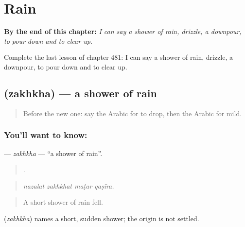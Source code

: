 
\chapter{Rain}
\label{ch:ar-rain}

\begin{chapteropening}
\textbf{By the end of this chapter:} \emph{I can say a shower of rain, drizzle, a downpour, to pour down and to clear up.}

Complete the last lesson of chapter 481: I can say a shower of rain, drizzle, a downpour, to pour down and to clear up.
\end{chapteropening}

\section[\texorpdfstring{\ar{زخة} (zakhkha)}{زخة (zakhkha)}]{ (zakhkha) — a shower of rain}

\label{lesson:AR-C481-zakhkha}



\begin{quote}
Before the new one: say the Arabic for to drop, then the Arabic for mild.
\end{quote}

\subsection*{You'll want to know: }
\textbf{} — \emph{zakhkha} — \textquotedblleft{}a shower of rain\textquotedblright{}.

\begin{quote}
   .
\end{quote}

\begin{quote}
\emph{nazalat zakhkhat maṭar qaṣīra.}
\end{quote}

\begin{quote}
A short shower of rain fell.
\end{quote}

\begin{cousinweb}
\textbf{} (\emph{zakhkha}) names a short, sudden shower; the origin is not settled.
\end{cousinweb}

